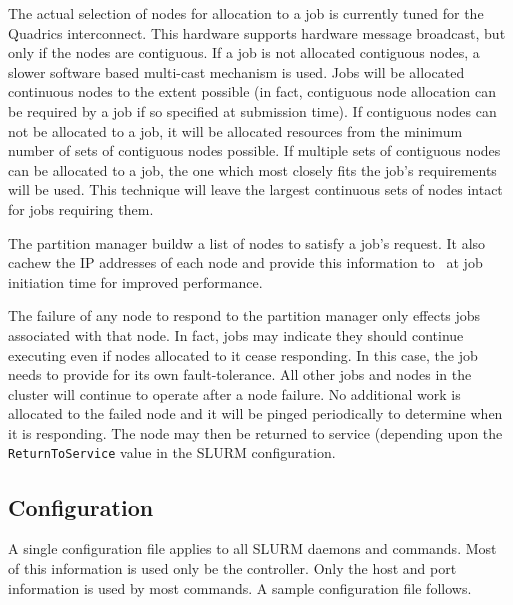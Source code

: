 The actual selection of nodes for allocation to a job is currently
tuned for the Quadrics interconnect.  This hardware supports hardware
message broadcast, but only if the nodes are contiguous.  If a job
is not allocated contiguous nodes, a slower software based multi-cast
mechanism is used.  Jobs will be allocated continuous nodes to the
extent possible (in fact, contiguous node allocation can be required
by a job if so specified at submission time).  If contiguous nodes
can not be allocated to a job, it will be allocated resources from
the minimum number of sets of contiguous nodes possible.  If multiple
sets of contiguous nodes can be allocated to a job, the one which most
closely fits the job's requirements will be used.  This technique will
leave the largest continuous sets of nodes intact for jobs requiring them.

The partition manager buildw a list of nodes to satisfy a job's
request.  It also cachew the IP addresses of
each node and provide this information to \srun\ at job initiation
time for improved performance.

The failure of any node to respond to the partition manager only
effects jobs associated with that node.  In fact, jobs may indicate they
should continue executing even if nodes allocated to it cease responding.
In this case, the job needs to provide for its own fault-tolerance.
All other jobs and nodes in the cluster will continue to operate after
a node failure.  No additional work is allocated to the failed
node and it will be pinged periodically to determine when it is 
responding. The node may then be returned to service (depending 
upon the {\tt ReturnToService} value in the SLURM configuration. 

\subsection{Configuration}

A single configuration file applies to all SLURM daemons and commands.
Most of this information is used only be the controller. 
Only the host and port information is used by most commands.
A sample configuration file follows.

